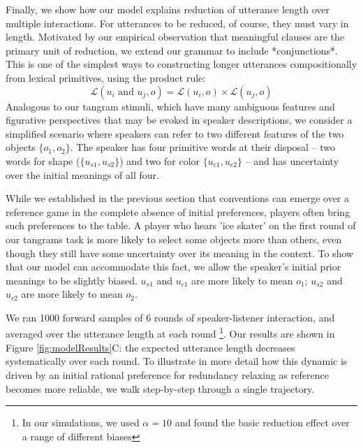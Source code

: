 Finally, we show how our model explains reduction of utterance length over multiple interactions. For utterances to be reduced, of course, they must vary in length. Motivated by our empirical observation that meaningful clauses are the primary unit of reduction, we extend our grammar to include *conjunctions*. This is one of the simplest ways to constructing longer utterances compositionally from lexical primitives, using the product rule:
$$\mathcal{L}(u_i \textrm{ and } u_j, o) = \mathcal{L}(u_i, o) \times \mathcal{L}(u_j, o)$$
\indent Analogous to our tangram stimuli, which have many ambiguous features and figurative perspectives that may be evoked in speaker descriptions, we consider a simplified scenario where speakers can refer to two different features of the two objects $\{o_1, o_2\}$. The speaker has four primitive words at their disposal -- two words for shape ($\{u_{s1}, u_{s2}\}$) and two for color $\{u_{c1}, u_{c2}\}$ -- and has uncertainty over the initial meanings of all four.

While we established in the previous section that conventions can emerge over a reference game in the complete absence of initial preferences, players often bring such preferences to the table. A player who hears 'ice skater' on the first round of our tangrams task is more likely to select some objects more than others, even though they still have some uncertainty over its meaning in the context. To show that our model can accommodate this fact, we allow the speaker's initial prior meanings to be slightly biased. $u_{s1}$ and $u_{c1}$ are more likely to mean $o_1$; $u_{s2}$ and $u_{c2}$ are more likely to mean $o_2$.

We ran 1000 forward samples of 6 rounds of speaker-listener interaction, and averaged over the utterance length at each round \footnote{In our simulations, we used $\alpha = 10$ and found the basic reduction effect over a range of different biases}. Our results are shown in Figure \ref{fig:modelResults}C: the expected utterance length decreases systematically over each round. To illustrate in more detail how this dynamic is driven by an initial rational preference for redundancy relaxing as reference becomes more reliable, we walk step-by-step through a single trajectory. 

